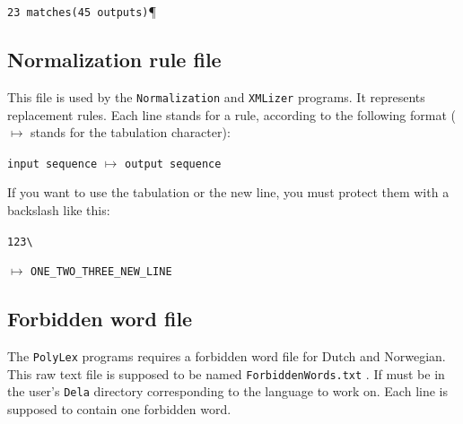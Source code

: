 \bigskip
\verb$23 matches(45 outputs)$\P



\subsection{Normalization rule file}
\label{section-normalization-file}
This file is used by the \verb+Normalization+ and \verb+XMLizer+ programs. It
represents replacement rules. Each line stands for a rule, according to the
following format ($\longmapsto$ stands for the tabulation character):

\bigskip
\noindent \verb+input sequence+ $\longmapsto$ \verb+output sequence+

\bigskip
\noindent If you want to use the tabulation or the new line, you must protect
them with a backslash like this:

\bigskip
\noindent
\verb+123\+

\noindent
$\longmapsto$ \verb+ONE_TWO_THREE_NEW_LINE+



\subsection{Forbidden word file}
 \label{section-forbidden-words}
The \verb+PolyLex+ programs requires a forbidden word file for Dutch and
Norwegian. This raw text file is supposed to be named \verb+ForbiddenWords.txt+
. If must be in the user's \verb+Dela+
directory corresponding to the language to work on. Each line is supposed to
contain one forbidden word.
